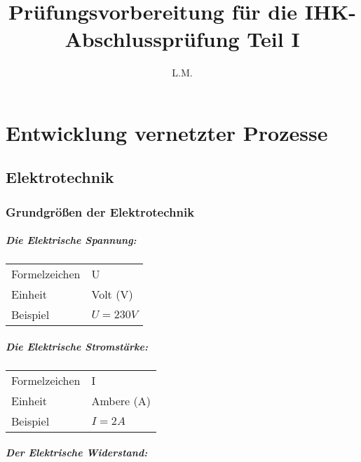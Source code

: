 \documentclass[a4paper, 12pt]{report}
\title{Prüfungsvorbereitung für die IHK-Abschlussprüfung Teil I}
\author{L.M.}
\begin{document}
\maketitle

\tableofcontents

\newpage
\chapter{Entwicklung vernetzter Prozesse}
\section{Elektrotechnik}
\subsection{Grundgrößen der Elektrotechnik}

\paragraph{Die Elektrische Spannung:}

\begin{center}
	\begin{tabular}{ ll }
		Formelzeichen & U            \\
		Einheit       & Volt (V)     \\
		Beispiel      & $U = 230V$ \\
	\end{tabular}
\end{center}

\paragraph{Die Elektrische Stromstärke:}

\begin{center}
	\begin{tabular}{ ll }
		Formelzeichen & I            \\
		Einheit       & Ambere (A)   \\
		Beispiel      & $I = 2A$    \\
	\end{tabular}
\end{center}

\paragraph{Der Elektrische Widerstand:}
\end{document}
